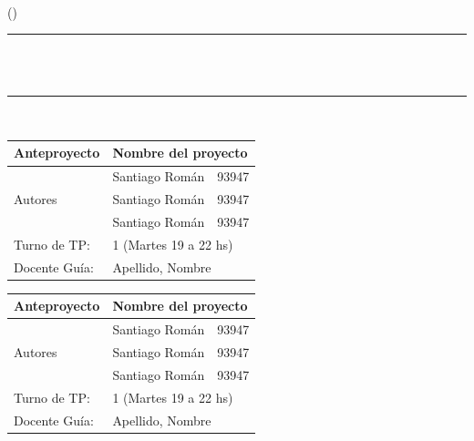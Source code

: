 \begin{titlepage}
	\centering
    \textsc{\large }\\[0.5 cm]
    \textsc{\large \nombreMateria  (\codigoMateria)}\\[0.5 cm] %
	\rule{\linewidth}{0.2 mm} \\[0.4 cm]
	{ \huge \tituloTP}\\[0.0cm]
	\rule{\linewidth}{0.2 mm} \\[1.5 cm]




\begin{table}[H]
\centering
\begin{tabular}{|l|l|l|}
\hline
Anteproyecto                  & \multicolumn{2}{l|}{Nombre del proyecto} \\ \hline
\multirow{3}{*}{Autores} &    Santiago Román       &     93947      \\ \cline{2-3} 
                  &     Santiago Román      &     93947      \\ \cline{2-3} 
                  &     Santiago Román      &     93947      \\ \hline
Turno de TP:                  & \multicolumn{2}{l|}{1 (Martes 19 a 22 hs)} \\ \hline
Docente Guía:                  &     \multicolumn{2}{l|}{Apellido, Nombre}                 \\ \hline
\end{tabular}
\end{table}

\begin{table}[H]
\centering
\begin{tabularx}{\textwidth}{|l|l|l|}
\hline
Anteproyecto                  & \multicolumn{2}{l|}{Nombre del proyecto} \\ \hline
\multirow{3}{*}{Autores} &    Santiago Román       &     93947      \\ \cline{2-3} 
                  &     Santiago Román      &     93947      \\ \cline{2-3} 
                  &     Santiago Román      &     93947      \\ \hline
Turno de TP:                  & \multicolumn{2}{l|}{1 (Martes 19 a 22 hs)} \\ \hline
Docente Guía:                  &     \multicolumn{2}{l|}{Apellido, Nombre}                 \\ \hline
\end{tabularx}
\end{table}


\end{titlepage}
